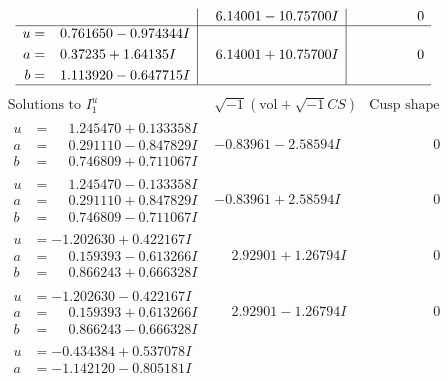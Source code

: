 \documentclass[1p]{elsarticle_modified}
\theoremstyle{definition}
\newcommand{\I}{\sqrt{-1}}
\begin{document}
$$\begin{array}{c|c|c}
 & \phantom{-}6.14001 - 10.75700 I & \phantom{-0.000000 } 0 \\ \hline\begin{aligned}
u &= \phantom{-}0.761650 - 0.974344 I \\
a &= \phantom{-}0.37235 + 1.64135 I \\
b &= \phantom{-}1.113920 - 0.647715 I\end{aligned}
 & \phantom{-}6.14001 + 10.75700 I & \phantom{-0.000000 } 0\\
 \hline 
 \end{array}$$\newpage$$\begin{array}{c|c|c}  
\text{Solutions to }I^u_{1}& \I (\text{vol} + \sqrt{-1}CS) & \text{Cusp shape}\\
 \hline 
\begin{aligned}
u &= \phantom{-}1.245470 + 0.133358 I \\
a &= \phantom{-}0.291110 - 0.847829 I \\
b &= \phantom{-}0.746809 + 0.711067 I\end{aligned}
 & -0.83961 - 2.58594 I & \phantom{-0.000000 } 0 \\ \hline\begin{aligned}
u &= \phantom{-}1.245470 - 0.133358 I \\
a &= \phantom{-}0.291110 + 0.847829 I \\
b &= \phantom{-}0.746809 - 0.711067 I\end{aligned}
 & -0.83961 + 2.58594 I & \phantom{-0.000000 } 0 \\ \hline\begin{aligned}
u &= -1.202630 + 0.422167 I \\
a &= \phantom{-}0.159393 - 0.613266 I \\
b &= \phantom{-}0.866243 + 0.666328 I\end{aligned}
 & \phantom{-}2.92901 + 1.26794 I & \phantom{-0.000000 } 0 \\ \hline\begin{aligned}
u &= -1.202630 - 0.422167 I \\
a &= \phantom{-}0.159393 + 0.613266 I \\
b &= \phantom{-}0.866243 - 0.666328 I\end{aligned}
 & \phantom{-}2.92901 - 1.26794 I & \phantom{-0.000000 } 0 \\ \hline\begin{aligned}
u &= -0.434384 + 0.537078 I \\
a &= -1.142120 - 0.805181 I \\

\end{aligned}
\end{array}$$
\end{document}
